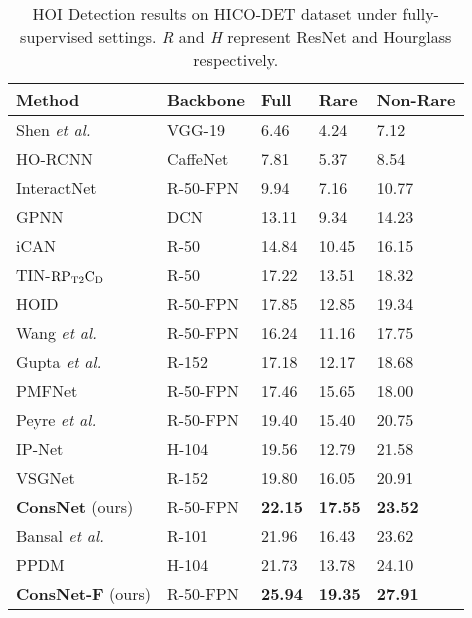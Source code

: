 \documentclass[sigconf,screen]{acmart}
\begin{document}
\begin{table}
\renewcommand\tabcolsep{4pt}
\caption{HOI Detection results on HICO-DET dataset under fully-supervised settings. \textit{R} and \textit{H} represent ResNet and Hourglass respectively.}
\label{tab:2}
\begin{tabularx}{\linewidth}{p{2.4cm}<{\raggedright}|p{1.45cm}<{\raggedright}|p{1cm}<{\centering}p{1cm}<{\centering}p{1cm}<{\centering}p{1cm}<{\centering}}
\toprule
\textbf{Method}&\textbf{Backbone}&\textbf{Full}&\textbf{Rare}&\multicolumn{2}{l}{\hspace{-0.15cm}\textbf{Non-Rare}}\\
\midrule
Shen \textit{et al.} \cite{shen2018scaling}&VGG-19&6.46&4.24&7.12\\
HO-RCNN \cite{chao2018learning}&CaffeNet&7.81&5.37&8.54\\
InteractNet \cite{gkioxari2018detecting}&R-50-FPN&9.94&7.16&10.77\\
GPNN \cite{qi2018learning}&DCN&13.11&9.34&14.23\\
iCAN \cite{gao2018ican}&R-50&14.84&10.45&16.15\\
TIN-${\rm{RP_{T2}C_D}}$ \cite{li2019transferable}&R-50&17.22&13.51&18.32\\
HOID \cite{wang2020discovering}&R-50-FPN&17.85&12.85&19.34\\
Wang \textit{et al.} \cite{wang2019deep}&R-50-FPN&16.24&11.16&17.75\\
Gupta \textit{et al.} \cite{gupta2019no}&R-152&17.18&12.17&18.68\\
PMFNet \cite{wan2019pose}&R-50-FPN&17.46&15.65&18.00\\
Peyre \textit{et al.} \cite{peyre2019detecting}&R-50-FPN&19.40&15.40&20.75\\
IP-Net \cite{wang2020learning}&H-104&19.56&12.79&21.58\\
VSGNet \cite{ulutan2020vsgnet}&R-152&19.80&16.05&20.91\\
\textbf{ConsNet} (ours)&R-50-FPN&\textbf{22.15}&\textbf{17.55}&\textbf{23.52}\\
\midrule
Bansal \textit{et al.} \cite{bansal2019detecting}&R-101&21.96&16.43&23.62\\
PPDM \cite{liao2020ppdm}&H-104&21.73&13.78&24.10\\
\textbf{ConsNet-F} (ours)&R-50-FPN&\textbf{25.94}&\textbf{19.35}&\textbf{27.91}\\
\bottomrule
\end{tabularx}
\end{table}
\end{document}
